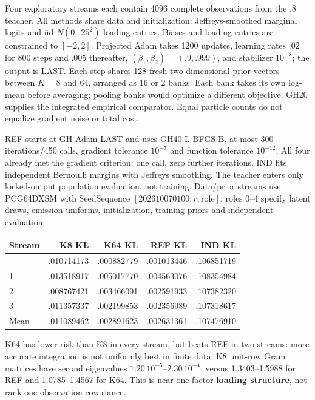 \documentclass{article}
\begin{document}
Four exploratory streams each contain 4096 complete observations from
the \(.8\) teacher. All methods share data and initialization:
Jeffreys-smoothed marginal logits and iid \(N(0,.25^2)\) loading
entries. Biases and loading entries are constrained to \([-2,2]\).
Projected Adam takes 1200 updates, learning rates \(.02\) for 800 steps
and \(.005\) thereafter, \((\beta_1,\beta_2)=(.9,.999)\), and stabilizer
\(10^{-8}\); the output is LAST. Each step shares 128 fresh
two-dimensional prior vectors between \(K=8\) and \(64\), arranged as 16
or 2 banks. Each bank takes its own log-mean before averaging; pooling
banks would optimize a different objective. GH20 supplies the integrated
empirical comparator. Equal particle counts do not equalize gradient
noise or total cost.

REF starts at GH-Adam LAST and uses GH40 L-BFGS-B, at most 300
iterations/450 calls, gradient tolerance \(10^{-7}\) and function
tolerance \(10^{-12}\). All four already met the gradient criterion: one
call, zero further iterations. IND fits independent Bernoulli margins
with Jeffreys smoothing. The teacher enters only locked-output
population evaluation, not training. Data/prior streams use PCG64DXSM
with SeedSequence \([202610070100,r,\mathrm{role}]\); roles 0--4 specify
latent draws, emission uniforms, initialization, training priors and
independent evaluation.

\begin{longtable}[]{@{}lrrrr@{}}
\toprule\noalign{}
Stream & K8 KL & K64 KL & REF KL & IND KL \\
\midrule\noalign{}
\endhead
\bottomrule\noalign{}
\endlastfoot
0 & .010714173 & .000882779 & .001013446 & .106851719 \\
1 & .013518917 & .005017770 & .004563076 & .108354984 \\
2 & .008767421 & .003466091 & .002591933 & .107382320 \\
3 & .011357337 & .002199853 & .002356989 & .107318617 \\
Mean & .011089462 & .002891623 & .002631361 & .107476910 \\
\end{longtable}

K64 has lower risk than K8 in every stream, but beats REF in two
streams: more accurate integration is not uniformly best in finite data.
K8 unit-row Gram matrices have second eigenvalues
\(1.20\,10^{-5}\)--\(2.30\,10^{-4}\), versus 1.3403--1.5988 for REF and
1.0785--1.4567 for K64. This is near-one-factor \textbf{loading
structure}, not rank-one observation covariance.
\end{document}
